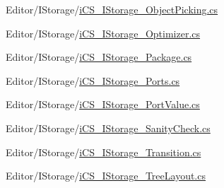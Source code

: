 \begin{DoxyCompactItemize}
Editor/\+I\+Storage/\hyperlink{i_c_s___i_storage___object_picking_8cs}{i\+C\+S\+\_\+\+I\+Storage\+\_\+\+Object\+Picking.\+cs}\item 
Editor/\+I\+Storage/\hyperlink{i_c_s___i_storage___optimizer_8cs}{i\+C\+S\+\_\+\+I\+Storage\+\_\+\+Optimizer.\+cs}\item 
Editor/\+I\+Storage/\hyperlink{i_c_s___i_storage___package_8cs}{i\+C\+S\+\_\+\+I\+Storage\+\_\+\+Package.\+cs}\item 
Editor/\+I\+Storage/\hyperlink{i_c_s___i_storage___ports_8cs}{i\+C\+S\+\_\+\+I\+Storage\+\_\+\+Ports.\+cs}\item 
Editor/\+I\+Storage/\hyperlink{i_c_s___i_storage___port_value_8cs}{i\+C\+S\+\_\+\+I\+Storage\+\_\+\+Port\+Value.\+cs}\item 
Editor/\+I\+Storage/\hyperlink{i_c_s___i_storage___sanity_check_8cs}{i\+C\+S\+\_\+\+I\+Storage\+\_\+\+Sanity\+Check.\+cs}\item 
Editor/\+I\+Storage/\hyperlink{i_c_s___i_storage___transition_8cs}{i\+C\+S\+\_\+\+I\+Storage\+\_\+\+Transition.\+cs}\item 
Editor/\+I\+Storage/\hyperlink{i_c_s___i_storage___tree_layout_8cs}{i\+C\+S\+\_\+\+I\+Storage\+\_\+\+Tree\+Layout.\+cs}\end{DoxyCompactItemize}
